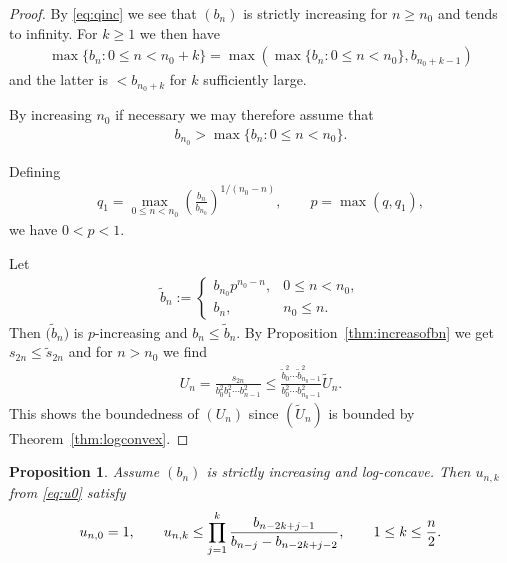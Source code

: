 \documentclass[pdftex]{sigma}
\numberwithin{equation}{section}
\newtheorem{prop}[thm]{Proposition}
\begin{document}
\begin{proof} By \eqref{eq:qinc} we see that $(b_n)$ is strictly increasing for $n\ge n_0$ and tends to infinity. For $k\ge 1$ we then have
\begin{gather*}
\max\{b_n\colon 0\le n<n_0+k\}=\max\left(\max\{b_n\colon 0\le n<n_0\}, b_{n_0+k-1}\right)
\end{gather*}
and the latter is $<b_{n_0+k}$ for $k$ sufficiently large.

By increasing $n_0$ if necessary we may therefore assume that
\begin{gather*}
b_{n_0}> \max\{b_n\colon 0\le n<n_0\}.
\end{gather*}

Defining
\begin{gather*}
q_1=\max_{0\le n<n_0} \left(\frac{b_n}{b_{n_0}}\right)^{1/(n_0-n)}, \qquad p=\max(q,q_1),
\end{gather*}
we have $0<p<1$.

Let
\begin{gather*}
\tilde{b}_n:=\begin{cases} b_{n_0}p^{n_0-n}, & 0\le n<n_0,\\
b_n, & n_0\le n.
\end{cases}
\end{gather*}
Then $\big(\tilde{b}_n\big)$ is $p$-increasing and $b_n\le\tilde{b}_n$. By Proposition~\ref{thm:increasofbn} we get $s_{2n}\le\tilde{s}_{2n}$ and for $n >n_0$ we find
\begin{gather*}
U_n=\frac{s_{2n}}{b_0^2b_1^2\cdots b_{n-1}^2}\le \frac{\tilde{b}_0^2\cdots \tilde{b}_{n_0-1}^2}{b_0^2\cdots b_{n_0-1}^2} \tilde{U}_n.
\end{gather*}
This shows the boundedness of $(U_n)$ since $(\tilde{U}_n)$ is bounded by Theorem~\ref{thm:logconvex}.
\end{proof}

\begin{prop}\label{thm:unk-logconcave}Assume $(b_n)$ is strictly increasing and log-concave. Then $u_{n,k}$ from \eqref{eq:u0} satisfy
\begin{gather}\label{eq:unk-logconcave}
u_{n,0}=1, \qquad u_{n,k}\le \prod_{j=1}^k {b_{n-2k+j-1}\over b_{n-j}-b_{n-2k+j-2}},\qquad 1\le k\le {n\over 2}.
\end{gather}
\end{prop}
\end{document}
